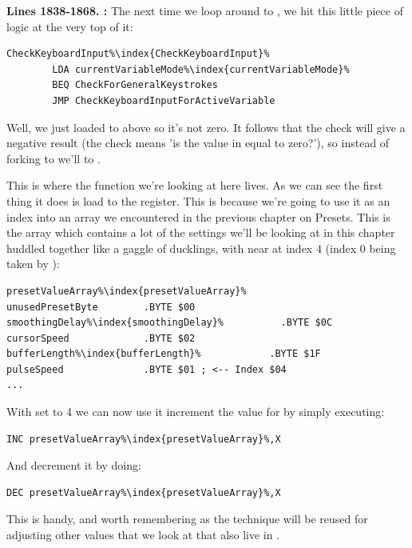 \textbf{Lines 1838-1868. :}  The next time we loop around
to , we hit this little piece of logic at the very top of it:

\begin{lstlisting}[escapechar=\%]
CheckKeyboardInput%\index{CheckKeyboardInput}%   
        LDA currentVariableMode%\index{currentVariableMode}%
        BEQ CheckForGeneralKeystrokes
        JMP CheckKeyboardInputForActiveVariable
\end{lstlisting}

Well, we just loaded  to  above so it's not zero.  It follows that
the  check will give a negative result (the check means 'is the value in  equal to zero?'), 
so instead of forking to  we'll  to .

This is where the function we're looking at here lives. As we can see the first thing it does is load 
 to the  register. This is because we're going to use it as an index
into an array we encountered in the previous chapter on Presets. This is the array 
which contains a lot of the settings we'll be looking at in this chapter huddled together like a gaggle
of ducklings, with  near at index 4 (index 0 being taken by ):

\begin{lstlisting}[escapechar=\%]
presetValueArray%\index{presetValueArray}%
unusedPresetByte        .BYTE $00
smoothingDelay%\index{smoothingDelay}%          .BYTE $0C
cursorSpeed             .BYTE $02
bufferLength%\index{bufferLength}%            .BYTE $1F
pulseSpeed              .BYTE $01 ; <-- Index $04
...
\end{lstlisting}

With  set to 4 we can now use it increment the value for  by
simply executing:
\begin{lstlisting}[escapechar=\%]
        INC presetValueArray%\index{presetValueArray}%,X
\end{lstlisting}
And decrement it by doing:
\begin{lstlisting}[escapechar=\%]
        DEC presetValueArray%\index{presetValueArray}%,X
\end{lstlisting}
This is handy, and worth remembering as the technique will be reused for adjusting other values that 
we look at that also live in .

